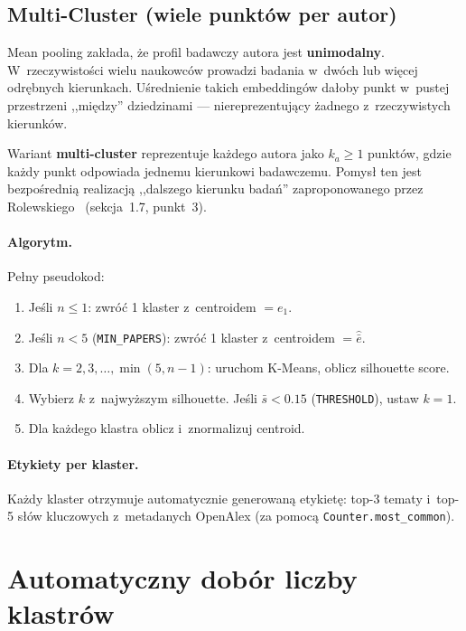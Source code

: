 \documentclass[a4paper,11pt]{article}
\begin{document}
\subsection{Multi-Cluster (wiele punktów per autor)}

Mean pooling zakłada, że profil badawczy autora jest \textbf{unimodalny}.
W~rzeczywistości wielu naukowców prowadzi badania w~dwóch lub więcej odrębnych kierunkach.
Uśrednienie takich embeddingów dałoby punkt w~pustej przestrzeni ,,między'' dziedzinami --- niereprezentujący żadnego z~rzeczywistych kierunków.

Wariant \textbf{multi-cluster} reprezentuje każdego autora jako $k_a \geq 1$ punktów, gdzie każdy punkt odpowiada jednemu kierunkowi badawczemu.
Pomysł ten jest bezpośrednią realizacją ,,dalszego kierunku badań'' zaproponowanego przez Rolewskiego~\cite{rolewski2024} (sekcja~1.7, punkt~3).

\paragraph{Algorytm.}
Pełny pseudokod:

\begin{enumerate}[nosep]
  \item Jeśli $n \leq 1$: zwróć 1 klaster z~centroidem $= e_1$.
  \item Jeśli $n < 5$ (\texttt{MIN\_PAPERS}): zwróć 1 klaster z~centroidem $= \hat{\bar{e}}$.
  \item Dla $k = 2, 3, \ldots, \min(5, n{-}1)$: uruchom K-Means, oblicz silhouette score.
  \item Wybierz $k$ z~najwyższym silhouette. Jeśli $\bar{s} < 0.15$ (\texttt{THRESHOLD}), ustaw $k{=}1$.
  \item Dla każdego klastra oblicz i~znormalizuj centroid.
\end{enumerate}

\paragraph{Etykiety per klaster.}
Każdy klaster otrzymuje automatycznie generowaną etykietę: top-3 tematy i~top-5 słów kluczowych z~metadanych OpenAlex (za pomocą \texttt{Counter.most\_common}).


\section{Automatyczny dobór liczby klastrów}
\end{document}
